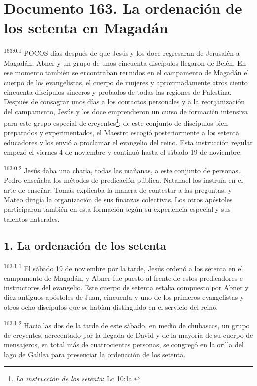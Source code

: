 \chapter{Documento 163. La ordenación de los setenta en Magadán}
\par 
\textsuperscript{163:0.1} POCOS días después de que Jesús y los doce regresaran de Jerusalén a Magadán, Abner y un grupo de unos cincuenta discípulos llegaron de Belén. En ese momento también se encontraban reunidos en el campamento de Magadán el cuerpo de los evangelistas, el cuerpo de mujeres y aproximadamente otros ciento cincuenta discípulos sinceros y probados de todas las regiones de Palestina. Después de consagrar unos días a los contactos personales y a la reorganización del campamento, Jesús y los doce emprendieron un curso de formación intensiva para este grupo especial de creyentes\footnote{\textit{La instrucción de los setenta}: Lc 10:1a.}; de este conjunto de discípulos bien preparados y experimentados, el Maestro escogió posteriormente a los setenta educadores y los envió a proclamar el evangelio del reino. Esta instrucción regular empezó el viernes 4 de noviembre y continuó hasta el sábado 19 de noviembre.

\par 
\textsuperscript{163:0.2} Jesús daba una charla, todas las mañanas, a este conjunto de personas. Pedro enseñaba los métodos de predicación pública. Natanael los instruía en el arte de enseñar; Tomás explicaba la manera de contestar a las preguntas, y Mateo dirigía la organización de sus finanzas colectivas. Los otros apóstoles participaron también en esta formación según su experiencia especial y sus talentos naturales.

\section*{1. La ordenación de los setenta}
\par 
\textsuperscript{163:1.1} El sábado 19 de noviembre por la tarde, Jesús ordenó a los setenta en el campamento de Magadán, y Abner fue puesto al frente de estos predicadores e instructores del evangelio. Este cuerpo de setenta estaba compuesto por Abner y diez antiguos apóstoles de Juan, cincuenta y uno de los primeros evangelistas y otros ocho discípulos que se habían distinguido en el servicio del reino.

\par 
\textsuperscript{163:1.2} Hacia las dos de la tarde de este sábado, en medio de chubascos, un grupo de creyentes, acrecentado por la llegada de David y de la mayoría de su cuerpo de mensajeros, en total más de cuatrocientas personas, se congregó en la orilla del lago de Galilea para presenciar la ordenación de los setenta.

